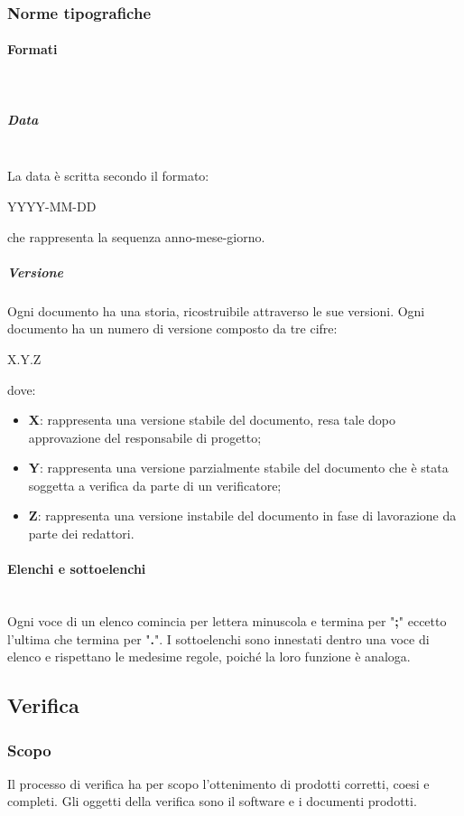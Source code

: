 		\subsubsection{Norme tipografiche}
			\paragraph{Formati} \mbox{}\\
			\subparagraph{Data} \mbox{}\\
			La data è scritta secondo il formato:\newline
			\centerline{YYYY-MM-DD}\newline
			che rappresenta la sequenza anno-mese-giorno.
			\subparagraph{Versione}
			Ogni documento ha una storia, ricostruibile attraverso le sue versioni. Ogni documento ha un numero di versione composto da tre cifre:
			\begin{center}
				X.Y.Z
			\end{center}
			dove:
			\begin{itemize}
				\item \textbf{X}: rappresenta una versione stabile del documento, resa tale dopo approvazione del responsabile di progetto;
				\item \textbf{Y}: rappresenta una versione parzialmente stabile del documento che è stata soggetta a verifica da parte di un verificatore;
				\item \textbf{Z}: rappresenta una versione instabile del documento in fase di lavorazione da parte dei redattori.
			\end{itemize}
			\paragraph{Elenchi e sottoelenchi} \mbox{}\\
			Ogni voce di un elenco comincia per lettera minuscola e termina per "\textbf{;}" eccetto l'ultima che termina per "\textbf{.}". I sottoelenchi sono innestati dentro una voce di elenco e rispettano le medesime regole, poiché la loro funzione è analoga.
	\subsection{Verifica}
		\subsubsection{Scopo}
		Il processo di verifica ha per scopo l'ottenimento di prodotti corretti, coesi e completi. Gli oggetti della verifica sono il software e i documenti prodotti. 
